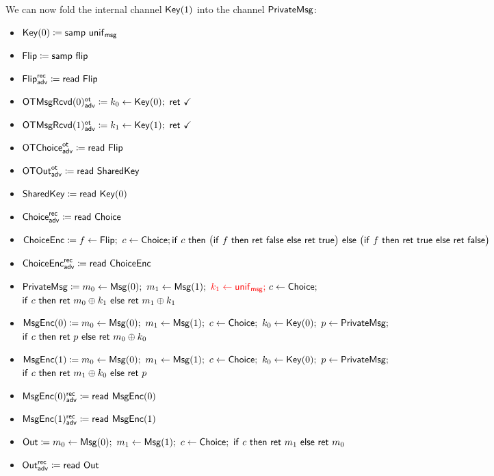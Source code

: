 \noindent We can now fold the internal channel $\mathsf{Key}(1)$ into the channel $\mathsf{PrivateMsg}$:

\begin{itemize}
\item $\mathsf{Key}(0) \coloneqq \mathsf{samp} \ \mathsf{unif}_{\mathsf{msg}}$
\item $\mathsf{Flip} \coloneqq \mathsf{samp} \ \mathsf{flip}$
\item {\color{blue} $\mathsf{Flip}^{\mathsf{rec}}_{\mathsf{adv}} \coloneqq \mathsf{read} \ \mathsf{Flip}$}
\item {\color{blue} $\LeakOTMsgRcvd(0)^\ot_\adv \coloneqq k_0 \leftarrow \Key(0); \ \ret{\checkmark}$}
\item {\color{blue} $\LeakOTMsgRcvd(1)^\ot_\adv \coloneqq k_1 \leftarrow \Key(1); \ \ret{\checkmark}$}
\item {\color{blue} $\mathsf{OTChoice}^{\mathsf{ot}}_{\mathsf{adv}} \coloneqq \mathsf{read} \ \mathsf{Flip}$}
\item {\color{blue} $\mathsf{OTOut}^{\mathsf{ot}}_{\mathsf{adv}} \coloneqq \mathsf{read} \ \mathsf{SharedKey}$}
\item $\mathsf{SharedKey} \coloneqq \mathsf{read} \ \mathsf{Key}(0)$
\item {\color{blue} $\mathsf{Choice}^{\mathsf{rec}}_{\mathsf{adv}} \coloneqq \mathsf{read} \ \mathsf{Choice}$}
\item $\mathsf{ChoiceEnc} \coloneqq f \leftarrow \mathsf{Flip}; \ c \leftarrow \mathsf{Choice}; \\ \mathsf{if} \ c \ \mathsf{then} \ \big(\mathsf{if} \ f \ \mathsf{then} \ \mathsf{ret} \ \mathsf{false} \ \mathsf{else} \ \mathsf{ret} \ \mathsf{true}\big) \ \mathsf{else} \ \big(\mathsf{if} \ f \ \mathsf{then} \ \mathsf{ret} \ \mathsf{true} \ \mathsf{else} \ \mathsf{ret} \ \mathsf{false}\big)$
\item {\color{blue} $\mathsf{ChoiceEnc}^{\mathsf{rec}}_{\mathsf{adv}} \coloneqq \mathsf{read} \ \mathsf{ChoiceEnc}$}
\item $\mathsf{PrivateMsg} \coloneqq m_0 \leftarrow \mathsf{Msg}(0); \ m_1 \leftarrow \mathsf{Msg}(1); \ {\color{red} k_1 \leftarrow \mathsf{unif}_{\mathsf{msg}};} \ c \leftarrow \mathsf{Choice};$ \\ $\mathsf{if} \ c \ \mathsf{then} \ \mathsf{ret} \ m_0 \oplus k_1 \ \mathsf{else} \ \mathsf{ret} \ m_1 \oplus k_1$
\item $\mathsf{MsgEnc}(0) \coloneqq m_0 \leftarrow \mathsf{Msg}(0); \ m_1 \leftarrow \mathsf{Msg}(1); \ c \leftarrow \mathsf{Choice}; \ k_0 \leftarrow \mathsf{Key}(0); \ p \leftarrow \mathsf{PrivateMsg};$ \\ $\mathsf{if} \ c \ \mathsf{then} \ \mathsf{ret} \ p \ \mathsf{else} \ \mathsf{ret} \ m_0 \oplus k_0$
\item $\mathsf{MsgEnc}(1) \coloneqq m_0 \leftarrow \mathsf{Msg}(0); \ m_1 \leftarrow \mathsf{Msg}(1); \ c \leftarrow \mathsf{Choice}; \ k_0 \leftarrow \mathsf{Key}(0); \ p \leftarrow \mathsf{PrivateMsg};$ \\ $\mathsf{if} \ c \ \mathsf{then} \ \mathsf{ret} \ m_1 \oplus k_0 \ \mathsf{else} \ \mathsf{ret} \ p$
\item {\color{blue} $\mathsf{MsgEnc}(0)^{\mathsf{rec}}_{\mathsf{adv}} \coloneqq \mathsf{read} \ \mathsf{MsgEnc}(0)$}
\item {\color{blue} $\mathsf{MsgEnc}(1)^{\mathsf{rec}}_{\mathsf{adv}} \coloneqq \mathsf{read} \ \mathsf{MsgEnc}(1)$}
\item $\Out \coloneqq m_0 \leftarrow \Msg(0); \ m_1 \leftarrow \Msg(1); \ c \leftarrow \Choice; \ \ifte{c}{\ret{m_1}}{\ret{m_0}}$
\item {\color{blue} $\mathsf{Out}^{\mathsf{rec}}_{\mathsf{adv}} \coloneqq \mathsf{read} \ \mathsf{Out}$}
\end{itemize}

